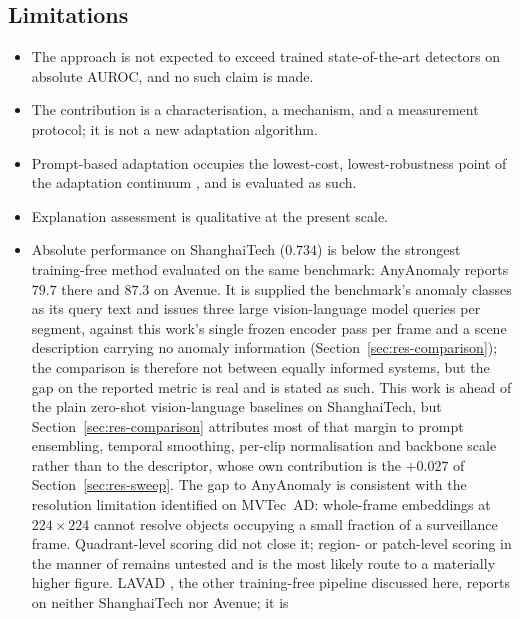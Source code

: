 \documentclass[a4paper,fleqn]{cas-sc}
\begin{document}
\subsection{Limitations}
\begin{itemize}
  \item The approach is not expected to exceed trained state-of-the-art detectors
        on absolute AUROC, and no such claim is made.
  \item The contribution is a characterisation, a mechanism, and a measurement
        protocol; it is not a new adaptation algorithm.
  \item Prompt-based adaptation occupies the lowest-cost, lowest-robustness point
        of the adaptation continuum \citep{fan2026llm}, and is evaluated as such.
  \item Explanation assessment is qualitative at the present scale.
  \item Absolute performance on ShanghaiTech ($0.734$) is below the strongest
        training-free method evaluated on the same benchmark: AnyAnomaly
        \citep{anyanomaly2025} reports $79.7$ there and $87.3$ on Avenue. It is
        supplied the benchmark's anomaly classes as its query text and issues
        three large vision-language model queries per segment, against this
        work's single frozen encoder pass per frame and a scene description
        carrying no anomaly information (Section~\ref{sec:res-comparison}); the
        comparison is therefore not between equally informed systems, but the
        gap on the reported metric is real and is stated as such. This work is
        ahead of the plain zero-shot vision-language baselines on ShanghaiTech,
        but Section~\ref{sec:res-comparison} attributes most of that margin to
        prompt ensembling, temporal smoothing, per-clip normalisation and
        backbone scale rather than to the descriptor, whose own contribution is
        the $+0.027$ of Section~\ref{sec:res-sweep}. The gap to AnyAnomaly is
        consistent with the
        resolution limitation identified on MVTec~AD: whole-frame embeddings at
        $224\times224$ cannot resolve objects occupying a small fraction of a
        surveillance frame. Quadrant-level scoring did not close it; region- or
        patch-level scoring in the manner of \citet{jeong2023winclip} remains
        untested and is the most likely route to a materially higher figure.
        LAVAD \citep{zanella2024lavad}, the other training-free pipeline
        discussed here, reports on neither ShanghaiTech nor Avenue; it is

\end{itemize}
\end{document}
